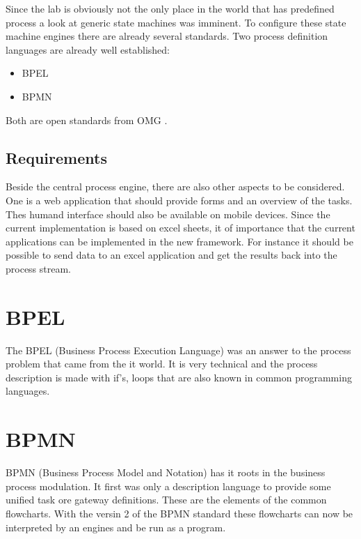 \documentclass[paper=a4,twoside=false,BCOR=0mm,DIV=calc,fontsize=12pt]{scrartcl}
\begin{document}
Since the lab is obviously not the only place in the world that has predefined process a look at generic state machines was imminent.
To configure these state  machine engines there are already several standards. Two process definition languages are already well established:

\begin{itemize}
 \item BPEL
 \item BPMN
\end{itemize}

Both are open standards from OMG \cite{omg}.


\subsection{Requirements}
Beside the central process engine, there are also other aspects to be considered. One is a web application that should provide forms and an overview
of the tasks. Thes humand interface should also be available on mobile devices.
Since the current implementation is based on excel sheets, it of importance that the current applications can be implemented in the new framework.
For instance it should be possible to send data to an excel application and get the results back into the process stream.




\section{BPEL}
The BPEL (Business Process Execution Language) was an answer to the process problem that came from the it world. It is very technical and the process description is made with if's, loops that are also known in common programming languages. 

\section{BPMN}
BPMN (Business Process Model and Notation) has it roots in the business process modulation. It first was only a description language to provide some unified task ore gateway definitions. These are the elements of the common flowcharts.
With the versin 2 of the BPMN standard these flowcharts can now be interpreted by an engines and be run as a program.
\end{document}
